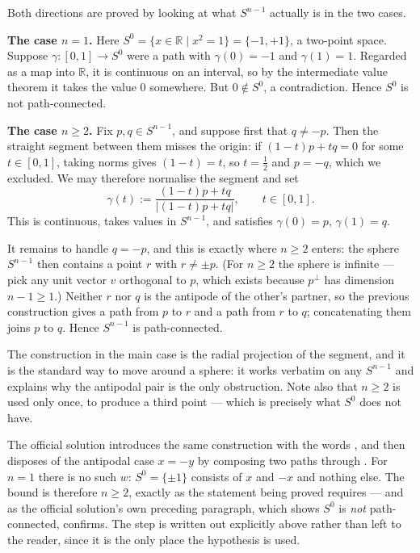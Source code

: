 \begin{exercisesolution}
\label{sol:sphere_path_connected}
Both directions are proved by looking at what $S^{n-1}$ actually is in the two cases.

\textbf{The case $n = 1$.} Here $S^0 = \{x \in \mathbb{R} \mid x^2 = 1\} = \{-1, +1\}$, a two-point
space. Suppose $\gamma : [0,1] \to S^0$ were a path with $\gamma(0) = -1$ and $\gamma(1) = 1$.
Regarded as a map into $\mathbb{R}$, it is continuous on an interval, so by the intermediate value
theorem it takes the value $0$ somewhere. But $0 \notin S^0$, a contradiction. Hence $S^0$ is not
path-connected.

\textbf{The case $n \ge 2$.} Fix $p, q \in S^{n-1}$, and suppose first that $q \neq -p$. Then the
straight segment between them misses the origin: if $(1-t)p + tq = 0$ for some $t \in [0,1]$, taking
norms gives $(1-t) = t$, so $t = \tfrac12$ and $p = -q$, which we excluded. We may therefore
normalise the segment and set
\[\gamma(t) := \frac{(1-t)p + tq}{\lvert (1-t)p + tq\rvert}, \qquad t \in [0,1].\]
This is continuous, takes values in $S^{n-1}$, and satisfies $\gamma(0) = p$, $\gamma(1) = q$.

It remains to handle $q = -p$, and this is exactly where $n \ge 2$ enters: the sphere $S^{n-1}$ then
contains a point $r$ with $r \neq \pm p$. (For $n \ge 2$ the sphere is infinite --- pick any unit
vector $v$ orthogonal to $p$, which exists because $p^\perp$ has dimension $n - 1 \ge 1$.) Neither
$r$ nor $q$ is the antipode of the other's partner, so the previous construction gives a path from
$p$ to $r$ and a path from $r$ to $q$; concatenating them joins $p$ to $q$. Hence $S^{n-1}$ is
path-connected.
\begin{remark}
The construction in the main case is the radial projection of the segment, and it is the standard way
to move around a sphere: it works verbatim on any $S^{n-1}$ and explains why the antipodal pair is
the only obstruction. Note also that $n \ge 2$ is used only once, to produce a third point --- which
is precisely what $S^0$ does not have.
\end{remark}
\begin{ainote}
The official solution introduces the same construction with the words , and
then disposes of the antipodal case $x = -y$ by composing two paths through . For $n = 1$ there is no such $w$: $S^0 = \{\pm1\}$ consists of $x$ and $-x$
and nothing else. The bound is therefore $n \ge 2$, exactly as the statement being proved requires
--- and as the official solution's own preceding paragraph, which shows $S^0$ is \emph{not}
path-connected, confirms. The step is written out explicitly above rather than left to the reader,
since it is the only place the hypothesis is used.
\end{ainote}
\end{exercisesolution}


